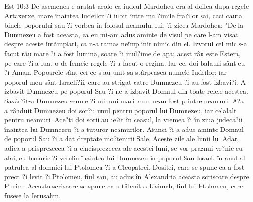 Est 10:3  De asemenea e aratat acolo ca iudeul Mardoheu era al doilea dupa regele Artaxerxe, mare înaintea Iudeilor ?i iubit între mul?imile fra?ilor sai, caci cauta binele poporului sau ?i vorbea în folosul neamului lui. ?i zicea Mardoheu: "De la Dumnezeu a fost aceasta, ca eu mi-am adus aminte de visul pe care l-am visat despre aceste întâmplari, ca n-a ramas neîmplinit nimic din el. Izvorul cel mic s-a facut râu mare ?i a fost lumina, soare ?i mul?ime de apa; acest râu este Estera, pe care ?i-a luat-o de femeie regele ?i a facut-o regina. Iar cei doi balauri sânt eu ?i Aman. Popoarele sânt cei ce s-au unit sa stârpeasca numele Iudeilor; iar poporul meu sânt Israeli?ii, care au strigat catre Dumnezeu ?i au fost izbavi?i. A izbavit Dumnezeu pe poporul Sau ?i ne-a izbavit Domnul din toate relele acestea. Savâr?it-a Dumnezeu semne ?i minuni mari, cum n-au fost printre neamuri. A?a a rânduit Dumnezeu doi sor?i: unul pentru poporul lui Dumnezeu, iar celalalt pentru neamuri. Ace?ti doi sorii au ie?it în ceasul, la vremea ?i în ziua judeca?ii înaintea lui Dumnezeu ?i a tuturor neamurilor. Atunci ?i-a adus aminte Domnul de poporul Sau ?i a dat dreptate mo?tenirii Sale. Aceste zile ale lunii lui Adar, adica a paisprezecea ?i a cincisprezecea ale acestei luni, se vor praznui ve?nic cu alai, cu bucurie ?i veselie înaintea lui Dumnezeu în poporul Sau Israel. în anul al patrulea al domniei lui Ptolomeu ?i a Cleopatrei, Dositei, care se spune ca a fost preot ?i levit ?i Ptolomeu, fiul sau, au adus în Alexandria aceasta scrisoare despre Purim. Aceasta scrisoare se spune ca a tâlcuit-o Lisimah, fiul lui Ptolomeu, care fusese la Ierusalim.


